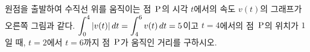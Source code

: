 \noindent\begin{minipage}[t]{0.58\linewidth}\vspace{0pt}\raggedright 원점을 출발하여 수직선 위를 움직이는 점~$\mathrm{P}$의 시각 $t$에서의 속도 $v(t)$의 그래프가 오른쪽 그림과 같다. $\displaystyle\int_{0}^{4}|v(t)|\mkern3mu dt=\int_{4}^{6} v(t)\mkern3mu dt=5$이고 $t=4$에서의 점~$\mathrm{P}$의 위치가 $1$일 때, $t=2$에서 $t=6$까지 점~$\mathrm{P}$가 움직인 거리를 구하시오.\end{minipage}\hfill\begin{minipage}[t]{0.4\linewidth}\vspace{0pt}\centering \resizebox{\ifdim\width>\linewidth\linewidth\else\width\fi}{!}{}\end{minipage}\par
